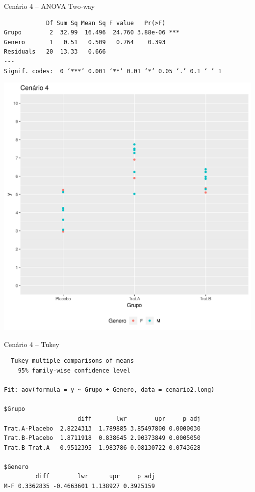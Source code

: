 \documentclass{beamer}
\begin{document}

\begin{frame}[fragile]{\scriptsize }
  \begin{exampleblock}{Cenário 4 -- ANOVA Two-way}
    \tiny
\begin{verbatim}
            Df Sum Sq Mean Sq F value   Pr(>F)
Grupo        2  32.99  16.496  24.760 3.88e-06 ***
Genero       1   0.51   0.509   0.764    0.393
Residuals   20  13.33   0.666
---
Signif. codes:  0 ‘***’ 0.001 ‘**’ 0.01 ‘*’ 0.05 ‘.’ 0.1 ‘ ’ 1
\end{verbatim}
    \begin{center}
      \includegraphics[height=.5\textheight]{Cap13-30/cenario22}
    \end{center}
  \end{exampleblock}
\end{frame}

\begin{frame}[fragile]{\scriptsize }
  \begin{exampleblock}{Cenário 4 -- Tukey}
    \tiny
\begin{verbatim}
  Tukey multiple comparisons of means
    95% family-wise confidence level

Fit: aov(formula = y ~ Grupo + Genero, data = cenario2.long)

$Grupo
                     diff       lwr        upr     p adj
Trat.A-Placebo  2.8224313  1.789885 3.85497800 0.0000030
Trat.B-Placebo  1.8711918  0.838645 2.90373849 0.0005050
Trat.B-Trat.A  -0.9512395 -1.983786 0.08130722 0.0743628

$Genero
         diff        lwr      upr     p adj
M-F 0.3362835 -0.4663601 1.138927 0.3925159
\end{verbatim}
  \end{exampleblock}
\end{frame}
\end{document}
